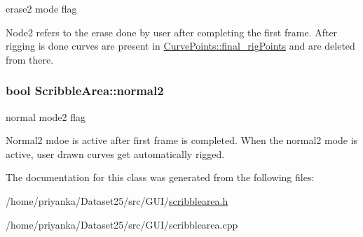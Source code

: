 erase2 mode flag 

\-Node2 refers to the erase done by user after completing the first frame. \-After rigging is done curves are present in \hyperlink{classCurvePoints_accc80a4b1d563df4709210c4196c3f8d}{\-Curve\-Points\-::final\-\_\-rig\-Points} and are deleted from there. \hypertarget{classScribbleArea_ab11228bd9b1bea22530184eef7b4e17b}{
\subsubsection[{normal2}]{\setlength{\rightskip}{0pt plus 5cm}bool {\bf \-Scribble\-Area\-::normal2}}}\label{classScribbleArea_ab11228bd9b1bea22530184eef7b4e17b}


normal mode2 flag 

\-Normal2 mdoe is active after first frame is completed. \-When the normal2 mode is active, user drawn curves get automatically rigged. 

\-The documentation for this class was generated from the following files\-:\begin{DoxyCompactItemize}
\item 
/home/priyanka/\-Dataset25/src/\-G\-U\-I/\hyperlink{scribblearea_8h}{scribblearea.\-h}\item 
/home/priyanka/\-Dataset25/src/\-G\-U\-I/scribblearea.\-cpp\end{DoxyCompactItemize}
